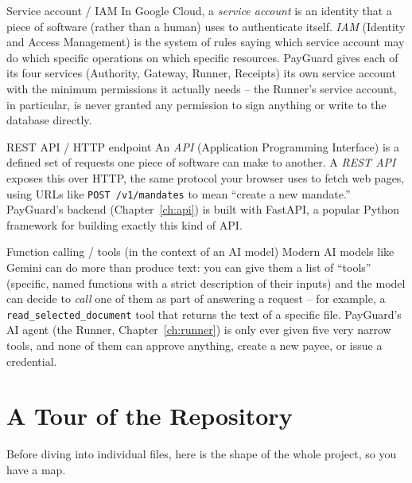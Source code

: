 \documentclass[11pt]{report}
\newcommand{\code}[1]{\texttt{#1}}
\begin{document}
\begin{concept}{Service account / IAM}
In Google Cloud, a \emph{service account} is an identity that a piece of
software (rather than a human) uses to authenticate itself.
\emph{IAM} (Identity and Access Management) is the system of rules
saying which service account may do which specific operations on which
specific resources. PayGuard gives each of its four services
(Authority, Gateway, Runner, Receipts) its own service account with the
minimum permissions it actually needs -- the Runner's service account, in
particular, is never granted any permission to sign anything or write to
the database directly.
\end{concept}

\begin{concept}{REST API / HTTP endpoint}
An \emph{API} (Application Programming Interface) is a defined set of
requests one piece of software can make to another. A \emph{REST API}
exposes this over HTTP, the same protocol your browser uses to fetch web
pages, using URLs like \code{POST /v1/mandates} to mean ``create a new
mandate.'' PayGuard's backend (Chapter~\ref{ch:api}) is built with
FastAPI, a popular Python framework for building exactly this kind of
API.
\end{concept}

\begin{concept}{Function calling / tools (in the context of an AI model)}
Modern AI models like Gemini can do more than produce text: you can give
them a list of ``tools'' (specific, named functions with a strict
description of their inputs) and the model can decide to \emph{call} one
of them as part of answering a request -- for example, a
\code{read\_selected\_document} tool that returns the text of a specific
file. PayGuard's AI agent (the Runner, Chapter~\ref{ch:runner}) is only
ever given five very narrow tools, and none of them can approve anything,
create a new payee, or issue a credential.
\end{concept}

\chapter{A Tour of the Repository}
\label{ch:tour}

Before diving into individual files, here is the shape of the whole
project, so you have a map.
\end{document}
